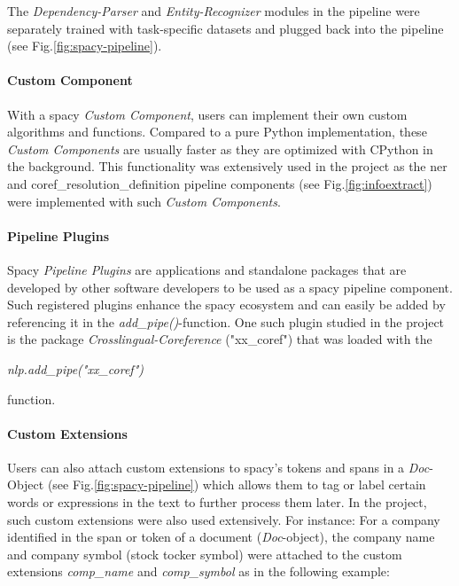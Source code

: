 The \emph{Dependency-Parser} and \emph{Entity-Recognizer} modules in the pipeline were separately trained with task-specific datasets and plugged back into the pipeline \cite{spacy} (see Fig.\ref{fig:spacy-pipeline}).

\paragraph{Custom Component}
With a spacy \emph{Custom Component}, users can implement their own custom algorithms and functions.
Compared to a pure Python implementation, these \emph{Custom Components} are usually faster as they are optimized with \gls{CPython} in the background.
This functionality was extensively used in the project as the \gls{ner} and \gls{coref_resolution_definition} pipeline components (see Fig.\ref{fig:infoextract}) were implemented with such \emph{Custom Components}.

\paragraph{Pipeline Plugins}\label{par:spacy-plugin}
Spacy \emph{Pipeline Plugins} are applications and standalone packages that are developed by other software developers to be used as a spacy pipeline component.
Such registered plugins enhance the spacy ecosystem and can easily be added by referencing it in the \textit{add\_pipe()}-function.
One such plugin studied in the project is the package \emph{Crosslingual-Coreference} ("xx\_coref") \cite{xxCoref} that was loaded with the
\begin{center}
\emph{nlp.add\_pipe("xx\_coref")}
\end{center}
function.

\paragraph{Custom Extensions}
Users can also attach custom extensions to spacy's \glspl{token} and \glspl{span} in a \emph{Doc}-Object (see Fig.\ref{fig:spacy-pipeline}) which allows them to tag or label certain words or expressions in the text to further process them later.
In the project, such custom extensions were also used extensively.
For instance: For a company identified in the \gls{span} or \gls{token} of a document (\emph{Doc}-object), the company name and company symbol (stock tocker symbol) were attached to the custom extensions \emph{comp\_name} and \emph{comp\_symbol} as in the following example:

